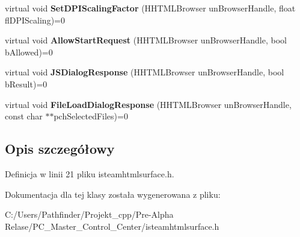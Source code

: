 \begin{DoxyCompactItemize}
\item 
\mbox{\label{class_i_steam_h_t_m_l_surface_ac288b2ccc4cc03e9f435748ea1928a96}} 
virtual void {\bfseries Set\+D\+P\+I\+Scaling\+Factor} (H\+H\+T\+M\+L\+Browser un\+Browser\+Handle, float fl\+D\+P\+I\+Scaling)=0
\item 
\mbox{\label{class_i_steam_h_t_m_l_surface_ab53e70f8779fab06069f782b8777d845}} 
virtual void {\bfseries Allow\+Start\+Request} (H\+H\+T\+M\+L\+Browser un\+Browser\+Handle, bool b\+Allowed)=0
\item 
\mbox{\label{class_i_steam_h_t_m_l_surface_a916bbdca59de2a048b850a12d17e15d9}} 
virtual void {\bfseries J\+S\+Dialog\+Response} (H\+H\+T\+M\+L\+Browser un\+Browser\+Handle, bool b\+Result)=0
\item 
\mbox{\label{class_i_steam_h_t_m_l_surface_af40eb06df1b74a6b5706dbf9cc7748f6}} 
virtual void {\bfseries File\+Load\+Dialog\+Response} (H\+H\+T\+M\+L\+Browser un\+Browser\+Handle, const char $\ast$$\ast$pch\+Selected\+Files)=0
\end{DoxyCompactItemize}


\subsection{Opis szczegółowy}


Definicja w linii 21 pliku isteamhtmlsurface.\+h.



Dokumentacja dla tej klasy została wygenerowana z pliku\+:\begin{DoxyCompactItemize}
\item 
C\+:/\+Users/\+Pathfinder/\+Projekt\+\_\+cpp/\+Pre-\/\+Alpha Relase/\+P\+C\+\_\+\+Master\+\_\+\+Control\+\_\+\+Center/isteamhtmlsurface.\+h\end{DoxyCompactItemize}
